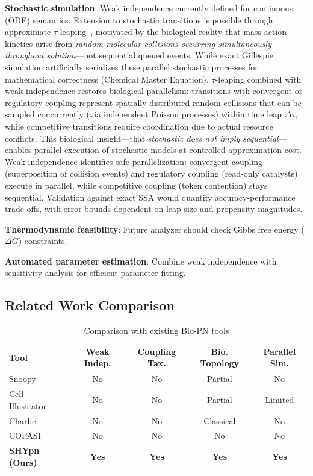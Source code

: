\documentclass{article}
\begin{document}
\textbf{Stochastic simulation}: Weak independence currently defined for continuous (ODE) semantics. Extension to stochastic transitions is possible through approximate $\tau$-leaping~\cite{Gillespie2001}, motivated by the biological reality that mass action kinetics arise from \emph{random molecular collisions occurring simultaneously throughout solution}---not sequential queued events. While exact Gillespie simulation artificially serializes these parallel stochastic processes for mathematical correctness (Chemical Master Equation), $\tau$-leaping combined with weak independence restores biological parallelism: transitions with convergent or regulatory coupling represent spatially distributed random collisions that can be sampled concurrently (via independent Poisson processes) within time leap $\Delta\tau$, while competitive transitions require coordination due to actual resource conflicts. This biological insight---that \emph{stochastic does not imply sequential}---enables parallel execution of stochastic models at controlled approximation cost. Weak independence identifies safe parallelization: convergent coupling (superposition of collision events) and regulatory coupling (read-only catalysts) execute in parallel, while competitive coupling (token contention) stays sequential. Validation against exact SSA would quantify accuracy-performance trade-offs, with error bounds dependent on leap size and propensity magnitudes.

\textbf{Thermodynamic feasibility}: Future analyzer should check Gibbs free energy ($\Delta G$) constraints.

\textbf{Automated parameter estimation}: Combine weak independence with sensitivity analysis for efficient parameter fitting.

\subsection{Related Work Comparison}

\begin{table}[t]
\centering
\caption{Comparison with existing Bio-PN tools}
\label{tab:comparison}
\begin{tabular}{lcccc}
\toprule
\textbf{Tool} & \textbf{Weak Indep.} & \textbf{Coupling Tax.} & \textbf{Bio. Topology} & \textbf{Parallel Sim.} \\
\midrule
Snoopy~\cite{Heiner2015} & No & No & Partial & No \\
Cell Illustrator~\cite{Nagasaki2011} & No & No & Partial & Limited \\
Charlie~\cite{Heiner2009} & No & No & Classical & No \\
COPASI~\cite{Hoops2006} & No & No & No & No \\
\textbf{SHYpn (Ours)} & \textbf{Yes} & \textbf{Yes} & \textbf{Yes} & \textbf{Yes} \\
\bottomrule
\end{tabular}
\end{table}
\end{document}
